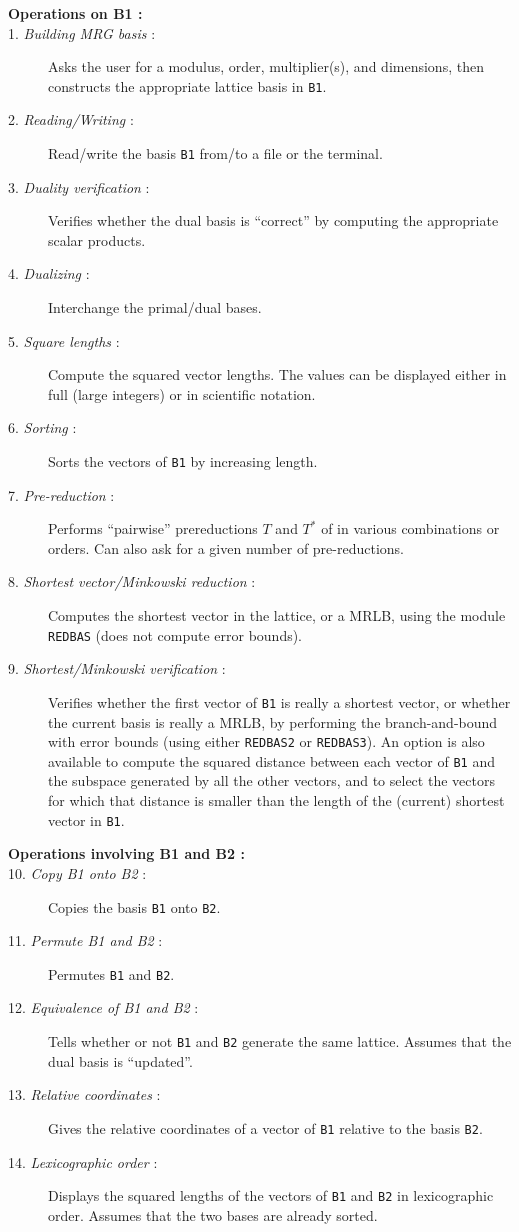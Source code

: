 \begin {description}
%
\item [{\bf Operations on B1 :}]
\item [1. {\em Building MRG basis\/} :]
   Asks the user for a modulus, order, multiplier(s), and dimensions,
   then constructs the appropriate lattice basis in {\tt B1}.
\item [2. {\em Reading/Writing\/} :]
   Read/write the basis {\tt B1} from/to a file or the terminal.
\item [3. {\em Duality verification\/} :]
   Verifies whether the dual basis is ``correct'' by computing the
   appropriate scalar products.
\item [4. {\em Dualizing\/} :]
   Interchange the primal/dual bases.
\item [5. {\em Square lengths\/} :]
   Compute the squared vector lengths.
   The values can be displayed either in full (large integers)
   or in scientific notation.
\item [6. {\em Sorting\/} :]
   Sorts the vectors of {\tt B1} by increasing length.
\item [7. {\em Pre-reduction\/} :]
   Performs ``pairwise'' prereductions $T$ and $T^*$ of \cite{rDIE75a}
   in various combinations or orders.
   Can also ask for a given number of pre-reductions.
\item [8. {\em Shortest vector/Minkowski reduction\/} :]
   Computes the shortest vector in the lattice, or a MRLB,
   using the module {\tt REDBAS} (does not compute error bounds).
\item [9. {\em Shortest/Minkowski verification\/} :]
   Verifies whether the first vector of {\tt B1} is really a
   shortest vector, or whether the current basis is really a MRLB,
   by performing the branch-and-bound with error bounds
   (using either {\tt REDBAS2} or {\tt REDBAS3}).
   An option is also available to compute the squared distance between
   each vector of {\tt B1} and the subspace generated by all the other vectors,
   and to select the vectors for which that distance is smaller than
   the length of the (current) shortest vector in {\tt B1}.
%
\item [{\bf Operations involving B1 and B2 :}]
\item [10. {\em Copy B1 onto B2\/} :]
   Copies the basis {\tt B1} onto {\tt B2}.
\item [11. {\em Permute B1 and B2\/} :]
   Permutes {\tt B1} and {\tt B2}.
\item [12. {\em Equivalence of B1 and B2\/} :]
   Tells whether or not {\tt B1} and {\tt B2} generate the same lattice.
   Assumes that the dual basis is ``updated''.
\item [13. {\em Relative coordinates\/} :]
   Gives the relative coordinates of a vector of {\tt B1} relative to
   the basis {\tt B2}.
\item [14. {\em Lexicographic order\/} :]
   Displays the squared lengths of the vectors of {\tt B1} and {\tt B2}
   in lexicographic order.
   Assumes that the two bases are already sorted.


\end{description}
